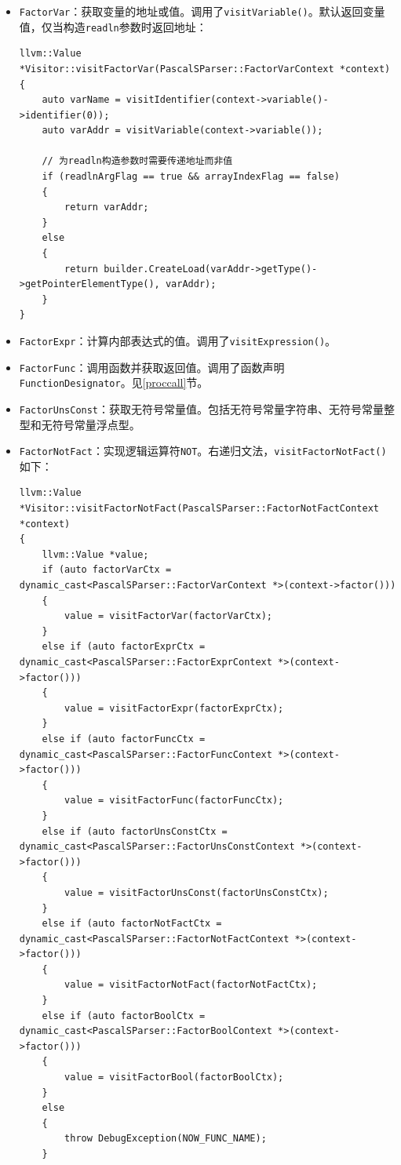 \documentclass[lang=cn,11pt,a4paper,cite=authornum]{paper}
\begin{document}
\begin{itemize}
    \item \texttt{FactorVar}：获取变量的地址或值。调用了\texttt{visitVariable()}。默认返回变量值，仅当构造\texttt{readln}参数时返回地址：
    \begin{code}
    \begin{verbatim}
llvm::Value *Visitor::visitFactorVar(PascalSParser::FactorVarContext *context)
{
    auto varName = visitIdentifier(context->variable()->identifier(0));
    auto varAddr = visitVariable(context->variable());

    // 为readln构造参数时需要传递地址而非值
    if (readlnArgFlag == true && arrayIndexFlag == false)
    {
        return varAddr;
    }
    else
    {
        return builder.CreateLoad(varAddr->getType()->getPointerElementType(), varAddr);
    }
}
    \end{verbatim}
    \end{code}
    \item \texttt{FactorExpr}：计算内部表达式的值。调用了\texttt{visitExpression()}。
    \item \texttt{FactorFunc}：调用函数并获取返回值。调用了函数声明\texttt{FunctionDesignator}。见\ref{proccall}节。
    \item \texttt{FactorUnsConst}：获取无符号常量值。包括无符号常量字符串、无符号常量整型和无符号常量浮点型。
    \item \texttt{FactorNotFact}：实现逻辑运算符\texttt{NOT}。右递归文法，\texttt{visitFactorNotFact()}如下：
    \begin{code}
    \begin{verbatim}
llvm::Value *Visitor::visitFactorNotFact(PascalSParser::FactorNotFactContext *context)
{
    llvm::Value *value;
    if (auto factorVarCtx = dynamic_cast<PascalSParser::FactorVarContext *>(context->factor()))
    {
        value = visitFactorVar(factorVarCtx);
    }
    else if (auto factorExprCtx = dynamic_cast<PascalSParser::FactorExprContext *>(context->factor()))
    {
        value = visitFactorExpr(factorExprCtx);
    }
    else if (auto factorFuncCtx = dynamic_cast<PascalSParser::FactorFuncContext *>(context->factor()))
    {
        value = visitFactorFunc(factorFuncCtx);
    }
    else if (auto factorUnsConstCtx = dynamic_cast<PascalSParser::FactorUnsConstContext *>(context->factor()))
    {
        value = visitFactorUnsConst(factorUnsConstCtx);
    }
    else if (auto factorNotFactCtx = dynamic_cast<PascalSParser::FactorNotFactContext *>(context->factor()))
    {
        value = visitFactorNotFact(factorNotFactCtx);
    }
    else if (auto factorBoolCtx = dynamic_cast<PascalSParser::FactorBoolContext *>(context->factor()))
    {
        value = visitFactorBool(factorBoolCtx);
    }
    else
    {
        throw DebugException(NOW_FUNC_NAME);
    }


\end{verbatim}
\end{code}
\end{itemize}
\end{document}
